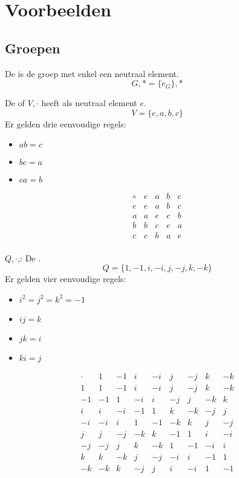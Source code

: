 \documentclass[main.tex]{subfiles}
\begin{document}
\chapter{Voorbeelden}
\label{cha:voorbeelden}

\section{Groepen}
\label{sec:groepen}

\begin{de}
  De  is de groep met enkel een neutraal element.
  \[ G,* = \{ e_{G} \},* \]
\commj {}
\end{de}

\begin{de}
  De  of  $V,\cdot$ heeft als neutraal element $e$.
  \[ V = \{ e, a, b, c \} \]
  Er gelden drie eenvoudige regels: 
  \begin{itemize}
  \item $ab = c$
  \item $bc = a$
  \item $ca = b$
  \end{itemize}
  \[
  \begin{array}{c|cccc}
    \circ & e & a & b & c \\
    \hline
    e & e & a & b & c \\
    a & a & e & c & b \\
    b & b & c & e & a \\
    c & c & b & a & e \\
  \end{array}
  \]
\commj \cycln
\end{de}

\begin{de}
  $Q,\cdot$,: De .\\
  \[ Q = \{ 1,-1,i,-i,j,-j,k,-k \} \]
  Er gelden vier eenvoudige regels:
  \begin{itemize}
  \item $i^{2}=j^{2}=k^{2}= -1$
  \item $ij=k$
  \item $jk=i$
  \item $ki=j$
  \end{itemize}
  \[
  \begin{array}{r|rrrrrrrr}
    \cdot & 1 & -1 & i & -i & j & -j & k & -k\\
    \hline
    1 & 1 & -1 & i & -i & j & -j & k & -k\\
    -1 & -1 & 1 & -i & i & -j & j & -k & k\\
    i & i & -i & -1 & 1 & k & -k & -j & j\\
    -i & -i & i & 1 & -1 & -k & k & j & -j\\
    j & j & -j & -k & k & -1 & 1 & i & -i\\
    -j & -j & j & k & -k & 1 & -1 & -i & i\\
    k & k & -k & j & -j & -i & i & -1 & 1\\
    -k & -k & k & -j & j & i & -i & 1 & -1
  \end{array}
  \]
\commn \cycln
\end{de}
\end{document}
